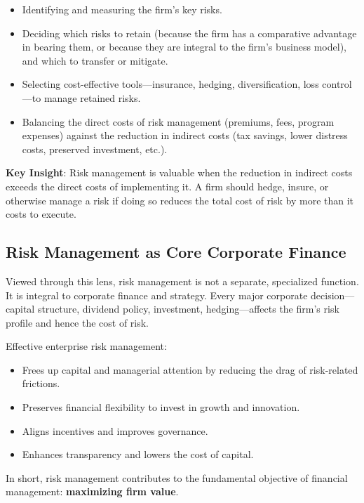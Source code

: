 \documentclass[11pt,openany]{book}
\providecommand{\tightlist}{\setlength{\itemsep}{0pt}\setlength{\parskip}{0pt}}
\begin{document}
\begin{itemize}
\tightlist
\item
  Identifying and measuring the firm's key risks.
\item
  Deciding which risks to retain (because the firm has a comparative advantage in bearing them, or because they are integral to the firm's business model), and which to transfer or mitigate.
\item
  Selecting cost-effective tools---insurance, hedging, diversification, loss control---to manage retained risks.
\item
  Balancing the direct costs of risk management (premiums, fees, program expenses) against the reduction in indirect costs (tax savings, lower distress costs, preserved investment, etc.).
\end{itemize}

\textbf{Key Insight}: Risk management is valuable when the reduction in indirect costs exceeds the direct costs of implementing it. A firm should hedge, insure, or otherwise manage a risk if doing so reduces the total cost of risk by more than it costs to execute.

\subsection{Risk Management as Core Corporate Finance}\label{risk-management-as-core-corporate-finance}

Viewed through this lens, risk management is not a separate, specialized function. It is integral to corporate finance and strategy. Every major corporate decision---capital structure, dividend policy, investment, hedging---affects the firm's risk profile and hence the cost of risk.

Effective enterprise risk management:

\begin{itemize}
\tightlist
\item
  Frees up capital and managerial attention by reducing the drag of risk-related frictions.
\item
  Preserves financial flexibility to invest in growth and innovation.
\item
  Aligns incentives and improves governance.
\item
  Enhances transparency and lowers the cost of capital.
\end{itemize}

In short, risk management contributes to the fundamental objective of financial management: \textbf{maximizing firm value}.
\end{document}
